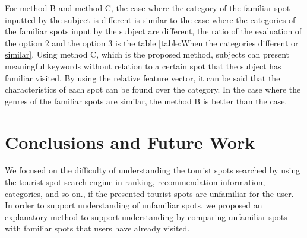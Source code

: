 \documentclass[journal]{IAENGtran}
\begin{document}
For method B and method C, the case where the category of the familiar spot inputted by the subject is different is similar to the case where the categories of the familiar spots input by the subject are different, the ratio of the evaluation of the option 2 and the option 3 is the table \ref{table:When the categories different or similar}.
Using method C, which is the proposed method, subjects can present meaningful keywords without relation to a certain spot that the subject has familiar visited.
By using the relative feature vector, it can be said that the characteristics of each spot can be found over the category.
In the case where the genres of the familiar spots are similar, the method B is better than the case.

\section{Conclusions and Future Work}
\label{sec:Conclusions and Future Work}
We focused on the difficulty of understanding the tourist spots searched by using the tourist spot search engine in ranking, recommendation information, categories, and so on., if the presented tourist spots are unfamiliar for the user.
In order to support understanding of unfamiliar spots, we proposed an explanatory method to support understanding by comparing unfamiliar spots with familiar spots that users have already visited.
\end{document}
